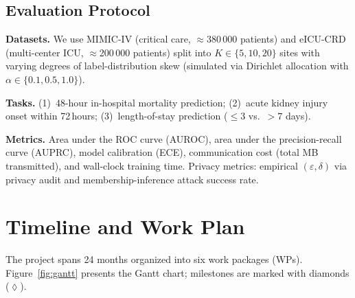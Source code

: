 \documentclass[11pt,a4paper]{article}
\begin{document}
{\subsection{Evaluation Protocol}

\textbf{Datasets.} We use MIMIC-IV (critical care, $\approx$380\,000 patients) and
eICU-CRD (multi-center ICU, $\approx$200\,000 patients) split into $K \in \{5, 10, 20\}$
sites with varying degrees of label-distribution skew (simulated via Dirichlet allocation
with $\alpha \in \{0.1, 0.5, 1.0\}$).

\textbf{Tasks.} (1)~48-hour in-hospital mortality prediction; (2)~acute kidney injury
onset within 72\,hours; (3)~length-of-stay prediction ($\leq 3$ vs.\ $> 7$ days).

\textbf{Metrics.} Area under the ROC curve (AUROC), area under the precision-recall curve
(AUPRC), model calibration (ECE), communication cost (total MB transmitted), and wall-clock
training time. Privacy metrics: empirical $(\varepsilon,\delta)$ via privacy audit and
membership-inference attack success rate.


\section{Timeline and Work Plan}

The project spans 24 months organized into six work packages (WPs). Figure~\ref{fig:gantt}
presents the Gantt chart; milestones are marked with diamonds ($\lozenge$).

\begin{figure}[htbp]
\centering
{}
\end{figure}}
\end{document}

